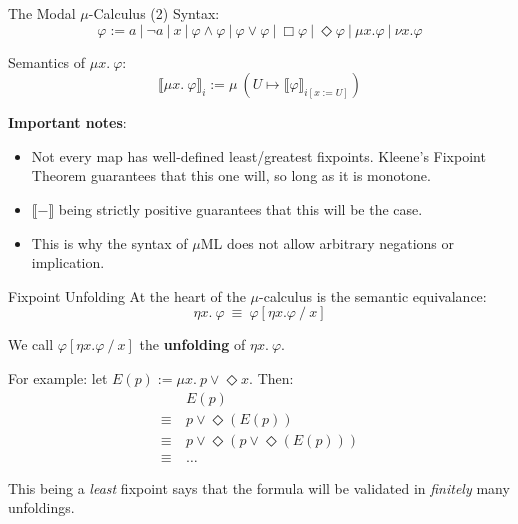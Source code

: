 \documentclass[aspectratio=169]{beamer}
\newcommand{\meaningof}[1]{\ensuremath{\llbracket #1 \rrbracket}}
\begin{document}
\begin{frame}{The Modal $\mu$-Calculus (2)}
  Syntax:
  \begin{equation*}
    \varphi := a~|~\neg a~|~x~|~\varphi \land \varphi~|~\varphi \lor \varphi~|~\Box \varphi~|~\Diamond \varphi~|~\mu x. \varphi~|~\nu x. \varphi
  \end{equation*}

  \bigskip

  Semantics of $\mu x.~\varphi$:
  \begin{equation*}
    \meaningof{\mu x.~\varphi}_{i} := \mu~(U \mapsto \meaningof{\varphi}_{i[x:=U]})
  \end{equation*}

  \bigskip

  \textbf{Important notes}:
          \smallskip
  \begin{itemize}
    \item Not every map has well-defined least/greatest fixpoints. Kleene's Fixpoint Theorem guarantees that this one will, so long as it is monotone.
          \smallskip
    \item $\meaningof{-}$ being strictly positive guarantees that this will be the case.
          \smallskip
    \item This is why the syntax of $\mu$ML does not allow arbitrary negations or implication.
  \end{itemize}

\end{frame}

\begin{frame}{Fixpoint Unfolding}
  At the heart of the $\mu$-calculus is the semantic equivalance:
    \begin{equation*}
      \eta x.~\varphi~\equiv~\varphi [ \eta x.\varphi ~/~x]
    \end{equation*}

  We call $\varphi [ \eta x.\varphi~/~x ]$ the \textbf{unfolding} of $\eta x.~\varphi$.

\bigskip

  For example: let $E(p) := \mu x.~p \lor \Diamond x$. Then:
  \begin{align*}
    &E(p) \\
    \equiv~&p \lor \Diamond(E(p)) \\
    \equiv~&p \lor \Diamond(p \lor \Diamond(E(p))) \\
    \equiv~&\ldots
  \end{align*}

  \bigskip

  This being a \emph{least} fixpoint says that the formula will be validated in \emph{finitely} many unfoldings.

\end{frame}
\end{document}
